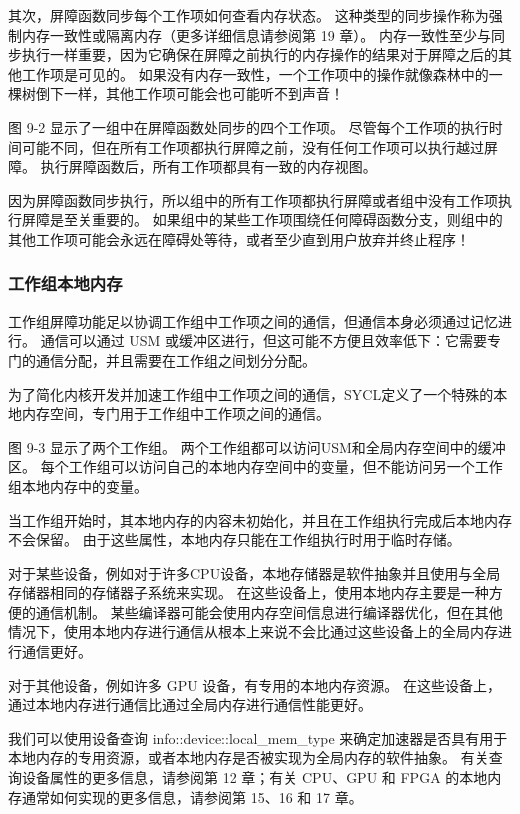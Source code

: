 其次，屏障函数同步每个工作项如何查看内存状态。 这种类型的同步操作称为强制内存一致性或隔离内存（更多详细信息请参阅第 19 章）。 内存一致性至少与同步执行一样重要，因为它确保在屏障之前执行的内存操作的结果对于屏障之后的其他工作项是可见的。 如果没有内存一致性，一个工作项中的操作就像森林中的一棵树倒下一样，其他工作项可能会也可能听不到声音！

图 9-2 显示了一组中在屏障函数处同步的四个工作项。 尽管每个工作项的执行时间可能不同，但在所有工作项都执行屏障之前，没有任何工作项可以执行越过屏障。 执行屏障函数后，所有工作项都具有一致的内存视图。

因为屏障函数同步执行，所以组中的所有工作项都执行屏障或者组中没有工作项执行屏障是至关重要的。 如果组中的某些工作项围绕任何障碍函数分支，则组中的其他工作项可能会永远在障碍处等待，或者至少直到用户放弃并终止程序！

\subsubsection{工作组本地内存}
工作组屏障功能足以协调工作组中工作项之间的通信，但通信本身必须通过记忆进行。 通信可以通过 USM 或缓冲区进行，但这可能不方便且效率低下：它需要专门的通信分配，并且需要在工作组之间划分分配。

为了简化内核开发并加速工作组中工作项之间的通信，SYCL定义了一个特殊的本地内存空间，专门用于工作组中工作项之间的通信。

图 9-3 显示了两个工作组。 两个工作组都可以访问USM和全局内存空间中的缓冲区。 每个工作组可以访问自己的本地内存空间中的变量，但不能访问另一个工作组本地内存中的变量。

当工作组开始时，其本地内存的内容未初始化，并且在工作组执行完成后本地内存不会保留。 由于这些属性，本地内存只能在工作组执行时用于临时存储。

对于某些设备，例如对于许多CPU设备，本地存储器是软件抽象并且使用与全局存储器相同的存储器子系统来实现。 在这些设备上，使用本地内存主要是一种方便的通信机制。 某些编译器可能会使用内存空间信息进行编译器优化，但在其他情况下，使用本地内存进行通信从根本上来说不会比通过这些设备上的全局内存进行通信更好。

对于其他设备，例如许多 GPU 设备，有专用的本地内存资源。 在这些设备上，通过本地内存进行通信比通过全局内存进行通信性能更好。

我们可以使用设备查询 info::device::local\_mem\_type 来确定加速器是否具有用于本地内存的专用资源，或者本地内存是否被实现为全局内存的软件抽象。 有关查询设备属性的更多信息，请参阅第 12 章；有关 CPU、GPU 和 FPGA 的本地内存通常如何实现的更多信息，请参阅第 15、16 和 17 章。


